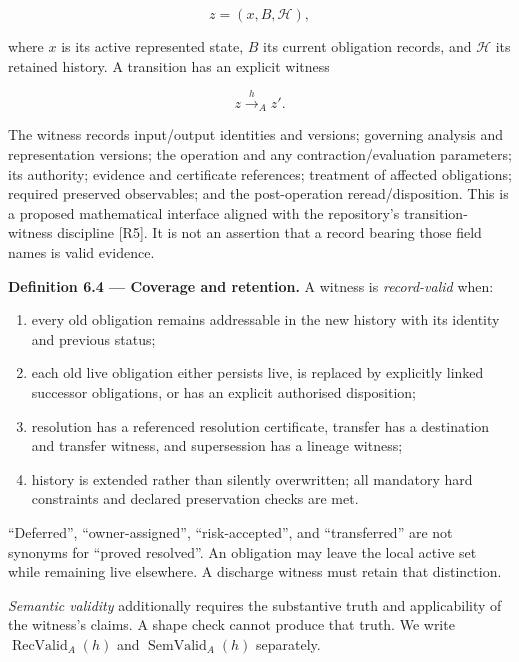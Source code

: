\documentclass[11pt,a4paper]{article}
\providecommand{\tightlist}{\setlength{\itemsep}{0pt}\setlength{\parskip}{0pt}}
\begin{document}
\[z=(x,B,\mathscr H),\]

where \(x\) is its active represented state, \(B\) its current
obligation records, and \(\mathscr H\) its retained history. A
transition has an explicit witness

\nopagebreak[4]

\[z\xrightarrow{h}_A z'.\]

The witness records input/output identities and versions; governing
analysis and representation versions; the operation and any
contraction/evaluation parameters; its authority; evidence and
certificate references; treatment of affected obligations; required
preserved observables; and the post-operation reread/disposition. This
is a proposed mathematical interface aligned with the repository's
transition-witness discipline {[}R5{]}. It is not an assertion that a
record bearing those field names is valid evidence.


\textbf{Definition 6.4 --- Coverage and retention.} A witness is
\emph{record-valid} when:

\begin{enumerate}
\def\labelenumi{\arabic{enumi}.}
\tightlist
\item
  every old obligation remains addressable in the new history with its
  identity and previous status;
\item
  each old live obligation either persists live, is replaced by
  explicitly linked successor obligations, or has an explicit authorised
  disposition;
\item
  resolution has a referenced resolution certificate, transfer has a
  destination and transfer witness, and supersession has a lineage
  witness;
\item
  history is extended rather than silently overwritten; all mandatory
  hard constraints and declared preservation checks are met.
\end{enumerate}

``Deferred'', ``owner-assigned'', ``risk-accepted'', and ``transferred''
are not synonyms for ``proved resolved''. An obligation may leave the
local active set while remaining live elsewhere. A discharge witness
must retain that distinction.

\emph{Semantic validity} additionally requires the substantive truth and
applicability of the witness's claims. A shape check cannot produce that
truth. We write \(\operatorname{RecValid}_A(h)\) and
\(\operatorname{SemValid}_A(h)\) separately.
\end{document}
